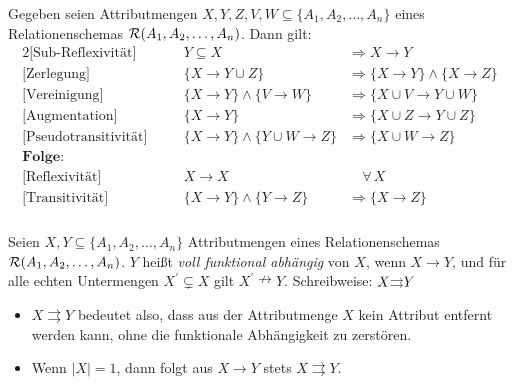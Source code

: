 \begin{frame}[t]\frametitle{\insertsection}
\framesubtitle{\insertsubsection}\label{frame:inferenzregeln}
\begin{theorem}[Inferenzregeln]
	Gegeben seien Attributmengen $X,Y,Z,V,W \subseteq \{A_1,A_2,\ldots,A_n\}$ eines Relationenschemas $\mathcal{R}(A_1,A_2,\ldots,A_n)$. 
	Dann gilt:
	\begin{alignat*}{2}
	\text{[Sub-Reflexivität]}& &\quad Y\subseteq X &\Rightarrow X \rightarrow Y\\
	\text{[Zerlegung]}& &\quad \{X\rightarrow Y\cup Z\}&\Rightarrow\{X\rightarrow Y\}\wedge\{X\rightarrow Z\}\\
	\text{[Vereinigung]}& &\quad \{X\rightarrow Y\}\wedge\{V\rightarrow W\}&\Rightarrow\{X\cup V\rightarrow Y\cup W\}\\
	\text{[Augmentation]}& &\quad \{X\rightarrow Y\}&\Rightarrow\{X\cup Z\rightarrow Y\cup Z\}\\
	\text{[Pseudotransitivität]}& &\quad \{X\rightarrow Y\}\wedge\{Y\cup W\rightarrow Z\}&\Rightarrow\{X\cup W\rightarrow Z\}\\
	\textbf{Folge:}& & &\\
	\text{[Reflexivität]}& &\quad X\rightarrow X &\quad\forall\,X\\
	\text{[Transitivität]} & & \quad \{X\rightarrow Y\}\wedge \{Y\rightarrow Z\}&\Rightarrow\{X\rightarrow Z\}
	\end{alignat*}
\end{theorem}
\end{frame}

\begin{frame}\frametitle{\insertsection}
\framesubtitle{\insertsubsection}
\begin{definition}
	Seien $X,Y\subseteq \{A_1,A_2,\ldots,A_n\}$ Attributmengen eines Relationenschemas $\mathcal{R}(A_1,A_2,\ldots,A_n)$.\nl
	$Y$ heißt \textit{voll funktional abhängig} von $X$, wenn $X\rightarrow Y$, und f\"ur alle echten Untermengen $X^\prime \subsetneq X$ 
	gilt $X^\prime\nrightarrow Y$. 
	\nl
	Schreibweise: $X{\large\rightrightarrows} Y$
\end{definition}
\onslide\pause 
\begin{itemize}
	\item $X\rightrightarrows Y$ bedeutet also, dass aus der Attributmenge $X$ kein Attribut entfernt werden kann, 
	ohne die funktionale Abhängigkeit zu zerstören. 
	\item Wenn $\vert X\vert = 1$, dann folgt aus $X\rightarrow Y$ stets $X\rightrightarrows Y$.
\end{itemize}
\end{frame}

